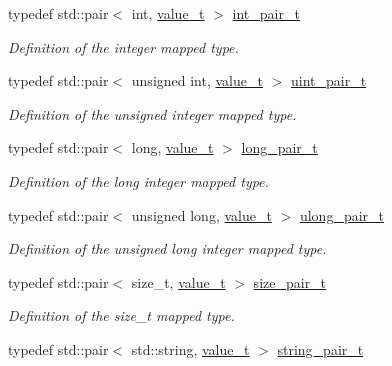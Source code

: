 \begin{DoxyCompactItemize}
typedef std\+::pair$<$ int, \hyperlink{struct_d_d4hep_1_1_primitive_a0639e73bb8f07f99c2d8401f807a7af6}{value\+\_\+t} $>$ \hyperlink{struct_d_d4hep_1_1_primitive_a216f9ee1122ffc970b0d419abe76009c}{int\+\_\+pair\+\_\+t}
\begin{DoxyCompactList}\small\item\em Definition of the integer mapped type. \end{DoxyCompactList}\item 
typedef std\+::pair$<$ unsigned int, \hyperlink{struct_d_d4hep_1_1_primitive_a0639e73bb8f07f99c2d8401f807a7af6}{value\+\_\+t} $>$ \hyperlink{struct_d_d4hep_1_1_primitive_a1f46f9637b5b90c407a5725db6d09142}{uint\+\_\+pair\+\_\+t}
\begin{DoxyCompactList}\small\item\em Definition of the unsigned integer mapped type. \end{DoxyCompactList}\item 
typedef std\+::pair$<$ long, \hyperlink{struct_d_d4hep_1_1_primitive_a0639e73bb8f07f99c2d8401f807a7af6}{value\+\_\+t} $>$ \hyperlink{struct_d_d4hep_1_1_primitive_a9430e72efcdbc036b1878b578f75c696}{long\+\_\+pair\+\_\+t}
\begin{DoxyCompactList}\small\item\em Definition of the long integer mapped type. \end{DoxyCompactList}\item 
typedef std\+::pair$<$ unsigned long, \hyperlink{struct_d_d4hep_1_1_primitive_a0639e73bb8f07f99c2d8401f807a7af6}{value\+\_\+t} $>$ \hyperlink{struct_d_d4hep_1_1_primitive_a776a90beccb1b044c258b851c8128509}{ulong\+\_\+pair\+\_\+t}
\begin{DoxyCompactList}\small\item\em Definition of the unsigned long integer mapped type. \end{DoxyCompactList}\item 
typedef std\+::pair$<$ size\+\_\+t, \hyperlink{struct_d_d4hep_1_1_primitive_a0639e73bb8f07f99c2d8401f807a7af6}{value\+\_\+t} $>$ \hyperlink{struct_d_d4hep_1_1_primitive_a330a7f3f969e59b48e16c6054668f7d3}{size\+\_\+pair\+\_\+t}
\begin{DoxyCompactList}\small\item\em Definition of the size\+\_\+t mapped type. \end{DoxyCompactList}\item 
typedef std\+::pair$<$ std\+::string, \hyperlink{struct_d_d4hep_1_1_primitive_a0639e73bb8f07f99c2d8401f807a7af6}{value\+\_\+t} $>$ \hyperlink{struct_d_d4hep_1_1_primitive_ab799730f156ae3e2ba15f621289c0e99}{string\+\_\+pair\+\_\+t}

\end{DoxyCompactItemize}
